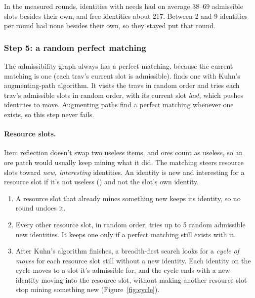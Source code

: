 \noindent In the measured rounds, identities with needs had on average 38--69 admissible slots besides their own, and free identities about 217. Between 2 and 9 identities per round had none besides their own, so they stayed put that round.

\subsubsection{Step 5: a random perfect matching}

The admissibility graph always has a perfect matching, because the current matching is one (each trav's current slot is admissible).  finds one with Kuhn's augmenting-path algorithm. It visits the travs in random order and tries each trav's admissible slots in random order, with its current slot \emph{last}, which pushes identities to move. Augmenting paths find a perfect matching whenever one exists, so this step never fails.

\paragraph{Resource slots.} Item reflection doesn't swap two useless items, and ores count as useless, so an ore patch would usually keep mining what it did. The matching steers resource slots toward \emph{new, interesting} identities. An identity is new and interesting for a resource slot if it's not useless () and not the slot's own identity.
\begin{enumerate}
  \item A resource slot that already mines something new keeps its identity, so no round undoes it.
  \item Every other resource slot, in random order, tries up to 5 random admissible new identities. It keeps one only if a perfect matching still exists with it.
  \item After Kuhn's algorithm finishes, a breadth-first search looks for a \emph{cycle of moves} for each resource slot still without a new identity. Each identity on the cycle moves to a slot it's admissible for, and the cycle ends with a new identity moving into the resource slot, without making another resource slot stop mining something new (Figure~\ref{fig:cycle}).
\end{enumerate}

